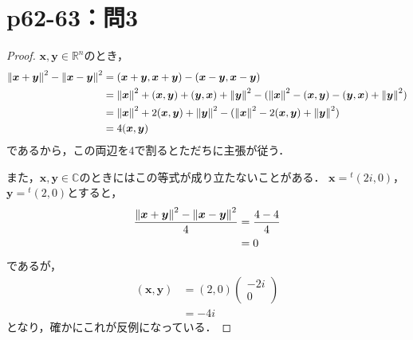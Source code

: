 \documentclass[a4paper,10pt,fleqn]{ltjsarticle}
\begin{document}
\section*{p62-63：問3}

\begin{tleftbar}
    \begin{proof}
        $\bm{x},\bm{y} \in \mathbb{R}^n$のとき，
        \begin{align*}
            \norm{\bm{x}+\bm{y}}^2 - \norm{\bm{x}-\bm{y}}^2 & = (\bm{x}+\bm{y},\bm{x}+\bm{y}) - (\bm{x}-\bm{y},\bm{x}-\bm{y})                                                                          \\
                                                            & = \norm{\bm{x}}^2 +(\bm{x},\bm{y})+(\bm{y},\bm{x})+ \norm{\bm{y}}^2 - (\norm{\bm{x}}^2 -(\bm{x},\bm{y})-(\bm{y},\bm{x})+\norm{\bm{y}}^2) \\
                                                            & = \norm{\bm{x}}^2 + 2(\bm{x},\bm{y}) + \norm{\bm{y}}^2 - (\norm{\bm{x}}^2 - 2(\bm{x},\bm{y}) + \norm{\bm{y}}^2)                          \\
                                                            & = 4(\bm{x},\bm{y})
        \end{align*}
        であるから，この両辺を$4$で割るとただちに主張が従う．

        また，$\bm{x},\bm{y} \in \mathbb{C}$のときにはこの等式が成り立たないことがある．
        $\bm{x}={}^t (2i,0)$，$\bm{y}={}^t (2,0)$とすると，
        \begin{align*}
            \frac{\norm{\bm{x}+\bm{y}}^2 - \norm{\bm{x}-\bm{y}}^2 }{4} & = \frac{4-4}{4} \\
                                                                       & =0
        \end{align*}
        であるが，
        \begin{align*}
            (\bm{x},\bm{y}) & =(2,0) \begin{pmatrix} -2i  \\ 0 \end{pmatrix} \\
                            & = -4i
        \end{align*}
        となり，確かにこれが反例になっている．
    \end{proof}
\end{tleftbar}

\newpage
\end{document}
